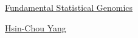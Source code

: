 \documentclass[11pt]{article}
\begin{document}
	\kaishu 
	\setcounter{section}{0}
	\begin{center}
		{\LARGE  \href{https://www.youtube.com/playlist?list=PLTp0eSi9MdkPp0swo8-VVplaG8bateq7q}{Fundamental Statistical Genomics}}
		
		
		{\large \href{https://www.stat.sinica.edu.tw/hsinchou/}{Hsin-Chou Yang}}
	\end{center}
\setcounter{page}{1}



\vspace{-1cm}
\end{document}
